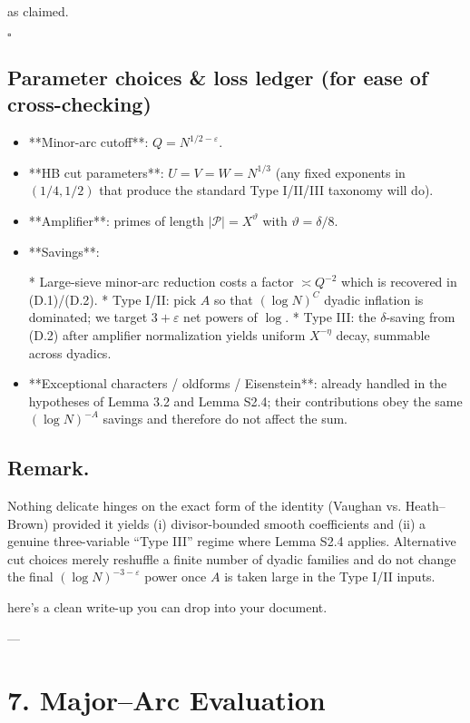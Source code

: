 \documentclass[11pt]{article}
\theoremstyle{definition}
\theoremstyle{remark}
\begin{document}
as claimed.

$\square$

\subsection*{Parameter choices \& loss ledger (for ease of cross-checking)}

\begin{itemize}
\item **Minor-arc cutoff**: $Q=N^{1/2-\varepsilon}$.
\item **HB cut parameters**: $U=V=W=N^{1/3}$ (any fixed exponents in $(1/4,1/2)$ that produce the standard Type I/II/III taxonomy will do).
\item **Amplifier**: primes of length $|\mathcal P|=X^\vartheta$ with $\vartheta=\delta/8$.
\item **Savings**:

  * Large-sieve minor-arc reduction costs a factor $\asymp Q^{-2}$ which is recovered in (D.1)/(D.2).
  * Type I/II: pick $A$ so that $(\log N)^C$ dyadic inflation is dominated; we target $3+\varepsilon$ net powers of $\log$.
  * Type III: the $\delta$-saving from (D.2) after amplifier normalization yields uniform $X^{-\eta}$ decay, summable across dyadics.
\item **Exceptional characters / oldforms / Eisenstein**: already handled in the hypotheses of Lemma 3.2 and Lemma S2.4; their contributions obey the same $(\log N)^{-A}$ savings and therefore do not affect the sum.
\end{itemize}

\subsection*{Remark.}

Nothing delicate hinges on the exact form of the identity (Vaughan vs. Heath–Brown) provided it yields (i) divisor-bounded smooth coefficients and (ii) a genuine three-variable “Type III” regime where Lemma S2.4 applies. Alternative cut choices merely reshuffle a finite number of dyadic families and do not change the final $(\log N)^{-3-\varepsilon}$ power once $A$ is taken large in the Type I/II inputs.

here’s a clean write-up you can drop into your document.

---

\section*{7. Major–Arc Evaluation}
\end{document}
